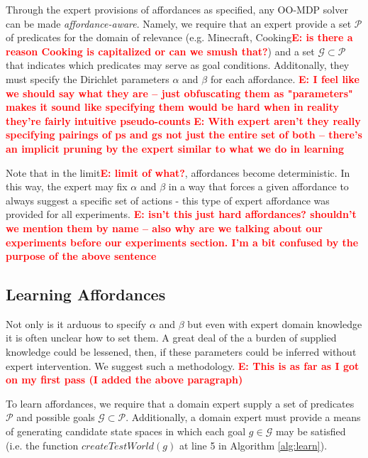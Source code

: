 \documentclass[conference]{IEEEtran}
\newcommand{\enote}[1]{\textcolor{Red}{\textbf{E: #1}}}
\begin{document}
Through the expert provisions of affordances as specified, any OO-MDP solver can be made
{\it affordance-aware}. Namely, we require that an expert provide a set $\mathcal{P}$ of predicates
for the domain of relevance (e.g. Minecraft, Cooking\enote{is there a reason Cooking is capitalized or can we smush that?}) and a set
$\mathcal{G} \subset \mathcal{P}$ that indicates which predicates may serve as goal conditions. Additonally, they must specify the Dirichlet parameters $\alpha$ and $\beta$ for each affordance. \enote{I feel like we should say what they are -- just obfuscating them as "parameters" makes it sound like specifying them would be hard when in reality they're fairly intuitive pseudo-counts} \enote{With expert aren't they really specifying pairings of ps and gs not just the entire set of both -- there's an implicit pruning by the expert similar to what we do in learning}

Note that
in the limit\enote{limit of what?}, affordances become deterministic. In this way, the expert may fix $\alpha$ and $\beta$ in a way that forces a given
affordance to always suggest a specific set of actions - this type of expert affordance was provided for all
experiments. \enote{isn't this just hard affordances? shouldn't we mention them by name -- also why are we talking about our experiments before our experiments section. I'm a bit confused by the purpose of the above sentence}

\subsection{Learning Affordances}

Not only is it arduous to specify $\alpha$ and $\beta$ but even with expert domain knowledge it is often unclear how to set them. A great deal of the a burden of supplied knowledge could be lessened, then, if these parameters could be inferred without expert intervention. We suggest such a methodology.
\enote{This is as far as I got on my first pass (I added the above paragraph)}

To learn affordances, we require that a domain expert supply a set of predicates
$\mathcal{P}$ and possible goals $\mathcal{G} \subset \mathcal{P}$. Additionally,
a domain expert must provide a means of generating candidate state spaces in which
each goal $g \in \mathcal{G}$ may be satisfied (i.e. the function $createTestWorld(g)$ at line 5 in Algorithm \ref{alg:learn}).
\end{document}
